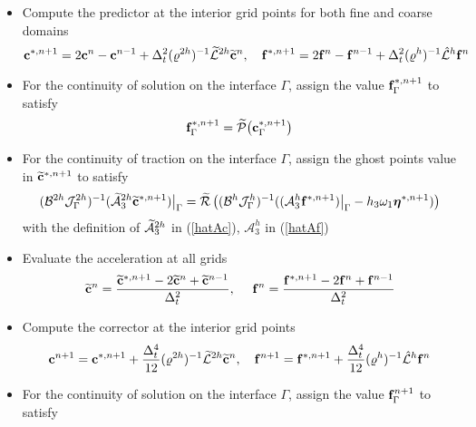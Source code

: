\begin{breakablealgorithm}
	\begin{itemize}
		\item  {Compute the predictor at the interior grid points for both fine and coarse domains
			\begin{equation*}
			{\bf c}^{*,n+1} = 2{\bf c}^{n} - {\bf c}^{n-1} + \Delta_t^2(\varrho^{2h})^{-1}{\wt{\mathcal{L}}}^{2h} \wt{\bf{c}}^{n},\ \ \ 
			{\bf f}^{*,n+1} = 2{\bf f}^{n} - {\bf f}^{n-1} + \Delta_t^2(\varrho^h)^{-1}\hat{\mathcal{L}}^{h} {\bf{f}}^{n}
			\end{equation*}
		}
		\item{For the continuity of solution on the interface $\Gamma$, assign the value ${\bf f}_{\Gamma}^{*,n+1}$ to satisfy
			\begin{equation*}
			{\bf f}^{*,n+1}_{\Gamma} = \widetilde{\mathcal{P}}\big({\bf c}^{*,n+1}_{\Gamma}\big)
			\end{equation*}
		}
		\item{For the continuity of traction on the interface $\Gamma$, assign the ghost points value in $\widetilde{\bf c}^{*,n+1}$ to satisfy
			\begin{equation}\label{traction_gamma_pre}
			(\mathcal{B}^{2h}{\mathcal J}_{\Gamma}^{2h})^{-1}(\wt{\mathcal{A}}_3^{2h}\wt{\bf c}^{*,n+1})\big|_\Gamma
			= \wt{\mathcal{R}}\left((\mathcal{B}^{h}{\mathcal J}^h_{\Gamma})^{-1}((\mathcal{A}_3^h{\bf f}^{*,n+1})\big|_\Gamma-h_3\omega_1{\bm \eta}^{\ast,n+1})\right)
			\end{equation}
			with the definition of $\widetilde{\mathcal{A}}_3^{2h}$ in (\ref{hatAc}), $\mathcal{A}_3^h$ in (\ref{hatAf}) 
		}
		\item{Evaluate the acceleration at all grids 
			\begin{equation*}
			\widetilde{\bf c}^n= \frac{\widetilde{\bf c}^{*,n+1}-2\widetilde{\bf c}^{n}+\widetilde{\bf c}^{n-1}}{\Delta^2_t},\ \ \ \
			{\bf f}^{n} = \frac{{\bf f}^{*,n+1}-2{\bf f}^{n}+{\bf f}^{n-1}}{\Delta^2_t}
			\end{equation*}
		}
		\item{Compute the corrector at the interior grid points
			\begin{equation*}
			{\bf c}^{n+1} = {\bf c}^{*,n+1} + \frac{\Delta_t^4}{12}(\varrho^{2h})^{-1}\wt{\mathcal{L}}^{2h}\wt{\bf{c}}^{n},\ \ \ 
			{\bf f}^{n+1} = {\bf f}^{*,n+1} + \frac{\Delta_t^4}{12}(\varrho^{h})^{-1}\hat{\mathcal{L}}^{h}{\bf{f}}^{n}
			\end{equation*}
		}
		\item{For the continuity of solution on the interface $\Gamma$, assign the value ${\bf f}^{n+1}_\Gamma$ to satisfy
}
\end{itemize}
\end{breakablealgorithm}
